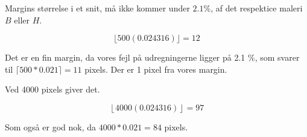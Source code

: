 \begin{definition}
	Margins størrelse i et snit, må ikke kommer under $2.1 \%$, af det respektice maleri $B$ eller $H$.
	\label{margin_min}
\end{definition}

\begin{equation}
	 \lfloor 500(0.024316)\rfloor = 12
\end{equation}

Det er en fin margin, da vores fejl på udregningerne ligger på 2.1 \%,
som svarer til $\lceil 500*0.021 \rceil = 11$ pixels. Der er 1 pixel fra vores
margin.

Ved 4000 pixels giver det.

\begin{equation}
	 \left\lfloor 4000(0.024316)\right\rfloor = 97
\end{equation}

Som også er god nok, da $4000*0.021 = 84$ pixels.
